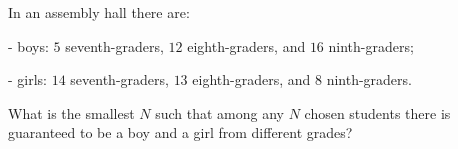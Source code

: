 In an assembly hall there are:

- boys: $5$ seventh-graders, $12$ eighth-graders, and $16$ ninth-graders;

- girls: $14$ seventh-graders, $13$ eighth-graders, and $8$ ninth-graders.



What is the smallest $N$ such that among any $N$ chosen students there is guaranteed to be a boy and a girl from different grades?
